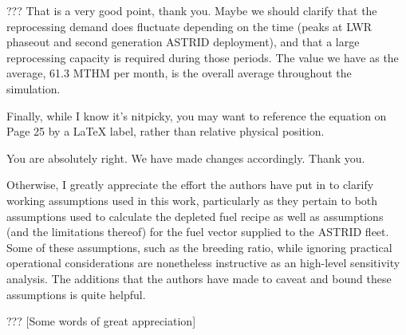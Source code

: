 \documentclass[answers,11pt]{exam}
\begin{document}
\begin{questions}
    \begin{solution}
    ???
    That is a very good point, thank you. Maybe we should clarify
    that the reprocessing demand does fluctuate depending on the
    time (peaks at LWR phaseout and second generation ASTRID
    deployment), and that a large reprocessing capacity is required
    during those periods. The value we have as the average,
    61.3 MTHM per month, is the overall average throughout the
    simulation.
    \end{solution}

    \question Finally, while I know it's nitpicky, you may want to reference the equation on Page 25 by a LaTeX label, rather than relative physical position.

    \begin{solution}
    You are absolutely right. We have made changes accordingly.
    Thank you.
    \end{solution}

    \question Otherwise, I greatly appreciate the effort the authors have put in to clarify working assumptions used in this work, particularly as they pertain to both assumptions used to calculate the depleted fuel recipe as well as assumptions (and the limitations thereof) for the fuel vector supplied to the ASTRID fleet. Some of these assumptions, such as the breeding ratio, while ignoring practical operational considerations are nonetheless instructive as an high-level sensitivity analysis. The additions that the authors have made to caveat and bound these assumptions is quite helpful.

    \begin{solution}
    ???
    [Some words of great appreciation]
    \end{solution}






\end{questions}
%
%
\end{document}
